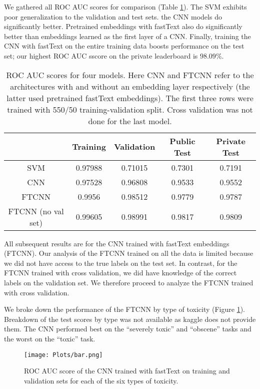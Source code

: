 \documentclass[12pt]{article}
\begin{document}
We gathered all ROC AUC scores for comparison (Table \ref{table-scores}). The SVM exhibits poor generalization to the validation and test sets. the CNN models do significantly better. Pretrained embeddings with fastText also do significantly better than embeddings learned as the first layer of a CNN. Finally, training the CNN with fastText on the entire training data boosts performance on the test set; our highest ROC AUC sscore on the private leaderboard is $98.09\%$.

\begin{table}
\centering
\begin{tabular}{|c|c|c|c|c|} \hline
\quad & Training & Validation & Public Test & Private Test \\ \hline
SVM & 0.97988 & 0.71015 & 0.7301 & 0.7191 \\
CNN & 0.97528 & 0.96808 & 0.9533 & 0.9552 \\
FTCNN & 0.9956 & 0.98512 & 0.9779 & 0.9787 \\ \hline
FTCNN (no val set) & 0.99605 & 0.98991 & 0.9817 & 0.9809 \\
\hline
\end{tabular}
\caption{\label{table-scores} ROC AUC scores for four models. Here CNN and FTCNN refer to the architectures with and without an embedding layer respectively (the latter used pretrained fastText embeddings). The first three rows were trained with 550/50 training-validation split. Cross validation was not done for the last model.}
\end{table}

All subsequent results are for the CNN trained with fastText embeddings (FTCNN). Our analysis of the FTCNN trained on all the data is limited because we did not have access to the true labels on the test set. In contrast, for the FTCNN trained with cross validation, we did have knowledge of the correct labels on the validation set. We therefore proceed to analyze the FTCNN trained with cross validation.

We broke down the performance of the FTCNN by type of toxicity (Figure \ref{fig-bar}). Breakdown of the test scores by type was not available as kaggle does not provide them. The CNN performed best on the ``severely toxic'' and ``obscene'' tasks and the worst on the ``toxic'' task.

\begin{figure}
\centering
\texttt{[image: Plots/bar.png]}
\caption{\label{fig-bar} ROC AUC score of the CNN trained with fastText on training and validation sets for each of the six types of toxicity.}
\end{figure}
\end{document}

